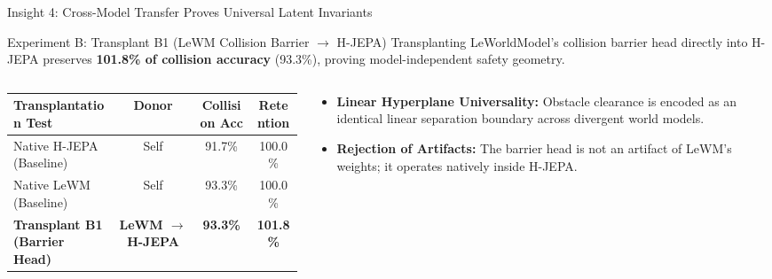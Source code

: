 \documentclass[aspectratio=169, 10pt]{beamer}
\begin{document}
\begin{frame}{Insight 4: Cross-Model Transfer Proves Universal Latent Invariants}
  \begin{block}{Experiment B: Transplant B1 (LeWM Collision Barrier $\to$ H-JEPA)}
    Transplanting LeWorldModel's collision barrier head directly into H-JEPA preserves \textbf{101.8\% of collision accuracy} (93.3\%), proving model-independent safety geometry.
  \end{block}
  \vspace{-0.2cm}
  \begin{columns}[T]
    \begin{column}{0.52\textwidth}
      \setlength{\tabcolsep}{3pt}
      \begin{table}
        \centering
        \scriptsize
        \begin{tabular}{lccc}
          \toprule
          \textbf{Transplantation Test} & \textbf{Donor} & \textbf{Collision Acc} & \textbf{Retention} \\
          \midrule
          Native H-JEPA (Baseline) & Self & 91.7\% & 100.0\% \\
          Native LeWM (Baseline) & Self & 93.3\% & 100.0\% \\
          \textbf{Transplant B1 (Barrier Head)} & \textbf{LeWM $\to$ H-JEPA} & \textbf{93.3\%} & \textbf{101.8\%} \\
          \bottomrule
        \end{tabular}
      \end{table}
    \end{column}
    \begin{column}{0.44\textwidth}
      \begin{itemize}
        \item \textbf{Linear Hyperplane Universality:} Obstacle clearance is encoded as an identical linear separation boundary across divergent world models.
        \item \textbf{Rejection of Artifacts:} The barrier head is not an artifact of LeWM's weights; it operates natively inside H-JEPA.
      \end{itemize}
    \end{column}
  \end{columns}
\end{frame}
\end{document}
